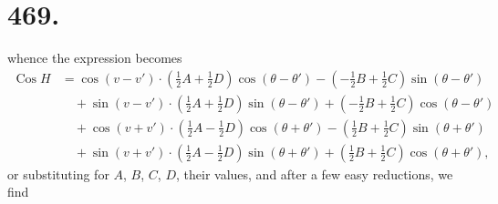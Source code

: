 \documentclass[11pt,a4paper]{article}
\theoremstyle{definition}
\DeclareMathOperator{\Cos}{Cos}
\begin{document}
\setlength{\parindent}{1em}
\setlength{\parskip}{0pt}


\section*{469.}
\markboth{THE ANGULAR DISTANCE OF TWO PLANETS.}{469]}

whence the expression becomes
\begin{align*}
\Cos H &= \cos(v-v') \cdot \left(\tfrac12 A + \tfrac12 D\right)\cos(\theta-\theta')
- \left(-\tfrac12 B + \tfrac12 C\right)\sin(\theta-\theta') \\
&\quad + \sin(v-v') \cdot \left(\tfrac12 A + \tfrac12 D\right)\sin(\theta-\theta')
+ \left(-\tfrac12 B + \tfrac12 C\right)\cos(\theta-\theta') \\
&\quad + \cos(v+v') \cdot \left(\tfrac12 A - \tfrac12 D\right)\cos(\theta+\theta')
- \left(\tfrac12 B + \tfrac12 C\right)\sin(\theta+\theta') \\
&\quad + \sin(v+v') \cdot \left(\tfrac12 A - \tfrac12 D\right)\sin(\theta+\theta')
+ \left(\tfrac12 B + \tfrac12 C\right)\cos(\theta+\theta'),
\end{align*}
or substituting for $A$, $B$, $C$, $D$, their values, and after a few easy reductions, we find
\end{document}

